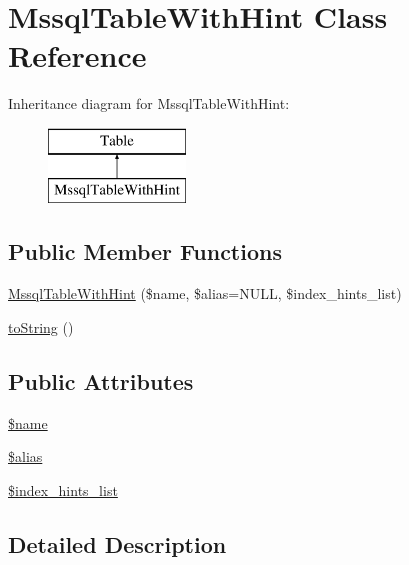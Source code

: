 \hypertarget{classMssqlTableWithHint}{\section{Mssql\+Table\+With\+Hint Class Reference}
\label{classMssqlTableWithHint}
}
Inheritance diagram for Mssql\+Table\+With\+Hint\+:\begin{figure}[H]
\begin{center}
\leavevmode
\includegraphics[height=2.000000cm]{classMssqlTableWithHint}
\end{center}
\end{figure}
\subsection*{Public Member Functions}
\begin{DoxyCompactItemize}
\item 
\hyperlink{classMssqlTableWithHint_a7d6526d0b856c8a5afe4b630b27ddbe4}{Mssql\+Table\+With\+Hint} (\$name, \$alias=N\+U\+L\+L, \$index\+\_\+hints\+\_\+list)
\item 
\hyperlink{classMssqlTableWithHint_ac73aaae941e5dd3f4c22d7c718a317f8}{to\+String} ()
\end{DoxyCompactItemize}
\subsection*{Public Attributes}
\begin{DoxyCompactItemize}
\item 
\hyperlink{classMssqlTableWithHint_a277ff00978ac421ee07783d796318bf5}{\$name}
\item 
\hyperlink{classMssqlTableWithHint_abe5643a9f48a397be1d66f7aba2fd7d9}{\$alias}
\item 
\hyperlink{classMssqlTableWithHint_af748588ba4420eb31c412a83b1623a60}{\$index\+\_\+hints\+\_\+list}
\end{DoxyCompactItemize}


\subsection{Detailed Description}



